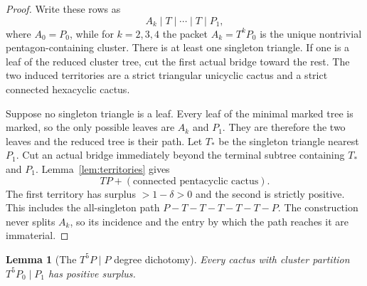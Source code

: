 \documentclass[11pt]{article}
\newtheorem{lemma}[theorem]{Lemma}
\begin{document}
\begin{proof}
Write these rows as
\[
 A_k\mid T\mid\cdots\mid T\mid P_1,
\]
where $A_0=P_0$, while for $k=2,3,4$ the packet
$A_k=T^kP_0$ is the unique nontrivial pentagon-containing cluster.  There is
at least one singleton triangle.  If one is a leaf of the reduced cluster tree,
cut the first actual bridge toward the rest.  The two induced territories are
a strict triangular unicyclic cactus and a strict connected hexacyclic cactus.

Suppose no singleton triangle is a leaf.  Every leaf of the minimal marked
tree is marked, so the only possible leaves are $A_k$ and $P_1$.  They are
therefore the two leaves and the reduced tree is their path.  Let $T_*$ be the
singleton triangle nearest $P_1$.  Cut an actual bridge immediately beyond the
terminal subtree containing $T_*$ and $P_1$.  Lemma~\ref{lem:territories}
gives
\[
 TP+(\text{connected pentacyclic cactus}).
\]
The first territory has surplus $>1-\delta>0$ and the second is strictly
positive.  This includes the all-singleton path
$P-T-T-T-T-T-P$.  The construction never splits $A_k$, so its incidence and
the entry by which the path reaches it are immaterial.
\end{proof}

\begin{lemma}[The $T^5P\mid P$ degree dichotomy]\label{lem:t5p-p}
Every cactus with cluster partition $T^5P_0\mid P_1$ has positive surplus.
\end{lemma}
\end{document}
